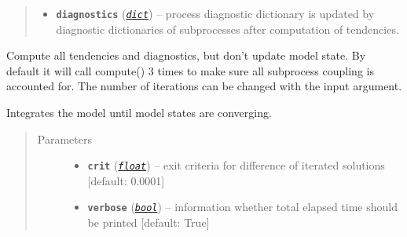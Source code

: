 \documentclass[a4paper,10pt,english]{sphinxmanual}
\begin{document}
\begin{fulllineitems}
\begin{fulllineitems}
\begin{quote}
\begin{description}
\begin{itemize}
\item {} 
\textbf{\texttt{diagnostics}} (\href{http://docs.python.org/2.7/library/stdtypes.html\#dict}{\emph{\texttt{dict}}}) -- process diagnostic dictionary is updated 
by diagnostic dictionaries of subprocesses 
after computation of tendencies.

\end{itemize}

\end{description}\end{quote}

\end{fulllineitems}


\begin{fulllineitems}
\label{api/climlab.process:climlab.process.time_dependent_process.TimeDependentProcess.compute_diagnostics}
Compute all tendencies and diagnostics, but don't update model state.
By default it will call compute() 3 times to make sure all
subprocess coupling is accounted for. The number of iterations can
be changed with the input argument.

\end{fulllineitems}


\begin{fulllineitems}
\label{api/climlab.process:climlab.process.time_dependent_process.TimeDependentProcess.integrate_converge}
Integrates the model until model states are converging.
\begin{quote}\begin{description}
\item[{Parameters}] \leavevmode\begin{itemize}
\item {} 
\textbf{\texttt{crit}} (\href{http://docs.python.org/2.7/library/functions.html\#float}{\emph{\texttt{float}}}) -- exit criteria for difference of iterated
solutions {[}default: 0.0001{]}

\item {} 
\textbf{\texttt{verbose}} (\href{http://docs.python.org/2.7/library/functions.html\#bool}{\emph{\texttt{bool}}}) -- information whether total elapsed time 
should be printed {[}default: True{]}


\end{itemize}
\end{description}
\end{quote}
\end{fulllineitems}
\end{fulllineitems}
\end{document}
